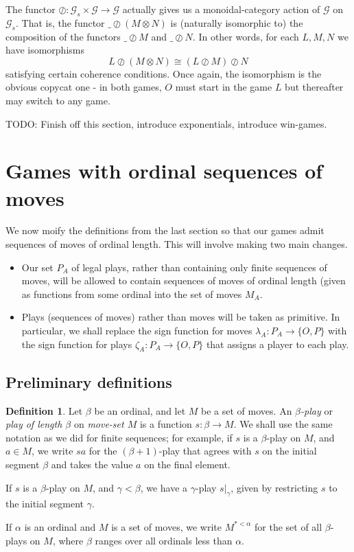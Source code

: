 \documentclass[11pt]{article} %
\theoremstyle{plain} %
\theoremstyle{definition} %
\newtheorem{definition}[theorem]{Definition}
\theoremstyle{exercisestyle}
\newcommand*\from{\colon}
\newcommand{\cmap}[3]{#1\from{}#2\to{}#3}
\newcommand{\tensor}{\otimes}
\newcommand{\sequoid}{\oslash}
\newcommand{\G}{\mathcal G}
\begin{document}
The functor $\cmap{\sequoid}{\G_s\times\G}\G$ actually gives us a monoidal-category action of $\G$ on $\G_s$.  That is, the functor $\_\sequoid (M\tensor N)$ is (naturally isomorphic to) the composition of the functors $\_\sequoid M$ and $\_\sequoid N$.  In other words, for each $L,M,N$ we have isomorphisms
\[
  L\sequoid(M\tensor N)\cong (L\sequoid M)\sequoid N
\]
satisfying certain coherence conditions.  Once again, the isomorphism is the obvious copycat one - in both games, $O$ must start in the game $L$ but thereafter may switch to any game.  

TODO: Finish off this section, introduce exponentials, introduce win-games.

\section{Games with ordinal sequences of moves}

We now moify the definitions from the last section so that our games admit sequences of moves of ordinal length.  This will involve making two main changes.

\begin{itemize}
  \item Our set $P_A$ of legal plays, rather than containing only finite sequences of moves, will be allowed to contain sequences of moves of ordinal length (given as functions from some ordinal into the set of moves $M_A$.
  \item Plays (sequences of moves) rather than moves will be taken as primitive.  In particular, we shall replace the sign function for moves $\cmap{\lambda_A}{P_A}{\{O,P\}}$ with the sign function for plays $\cmap{\zeta_A}{P_A}{\{O,P\}}$ that assigns a player to each play.
\end{itemize}

\subsection{Preliminary definitions}

\begin{definition}
  Let $\beta$ be an ordinal, and let $M$ be a set of moves.  An \emph{$\beta$-play} or \emph{play of length $\beta$} on \emph{move-set $M$} is a function $\cmap{s}{\beta}{M}$.  We shall use the same notation as we did for finite sequences; for example, if $s$ is a $\beta$-play on $M$, and $a\in M$, we write $sa$ for the $(\beta+1)$-play that agrees with $s$ on the initial segment $\beta$ and takes the value $a$ on the final element.

  If $s$ is a $\beta$-play on $M$, and $\gamma<\beta$, we have a $\gamma$-play $s\vert_\gamma$, given by restricting $s$ to the initial segment $\gamma$.

  If $\alpha$ is an ordinal and $M$ is a set of moves, we write $M^{*<\alpha}$ for the set of all $\beta$-plays on $M$, where $\beta$ ranges over all ordinals less than $\alpha$.  
\end{definition}
\end{document}
